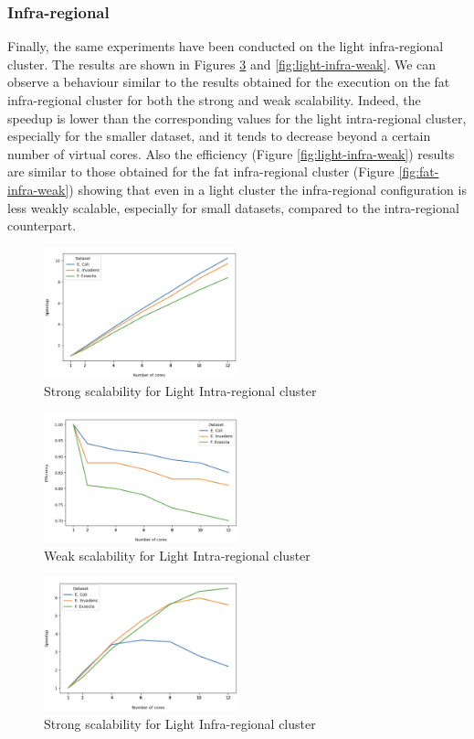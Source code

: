 \documentclass[final,5p,times,twocolumn,authoryear]{elsarticle}
\begin{document}
\subsubsection{Infra-regional}
Finally, the same experiments have been conducted on the light infra-regional cluster. The results are shown in Figures \ref{fig:light-infra-strong} and \ref{fig:light-infra-weak}. We can observe a behaviour similar to the results obtained for the execution on the fat infra-regional cluster for both the strong and weak scalability. Indeed, the speedup is lower than the corresponding values for the light intra-regional cluster, especially for the smaller dataset, and it tends to decrease beyond a certain number of virtual cores. Also the efficiency (Figure \ref{fig:light-infra-weak}) results are similar to those obtained for the fat infra-regional cluster (Figure \ref{fig:fat-infra-weak}) showing that even in a light cluster the infra-regional configuration is less weakly scalable, especially for small datasets, compared to the intra-regional counterpart. 
\begin{figure}
    \centering
    \includegraphics[width=0.5\textwidth]{images/light_intra_strong.png}
    \caption{Strong scalability for Light Intra-regional cluster }
    \label{fig:light-intra-strong}
\end{figure}
\begin{figure}
    \centering
    \includegraphics[width=0.5\textwidth]{images/light_intra_weak.png}
    \caption{Weak scalability for Light Intra-regional cluster }
    \label{fig:light-intra-weak}
\end{figure}
\begin{figure}
    \centering
    \includegraphics[width=0.5\textwidth]{images/light_infra_strong.png}
    \caption{Strong scalability for Light Infra-regional cluster }
    \label{fig:light-infra-strong}
\end{figure}
\end{document}
